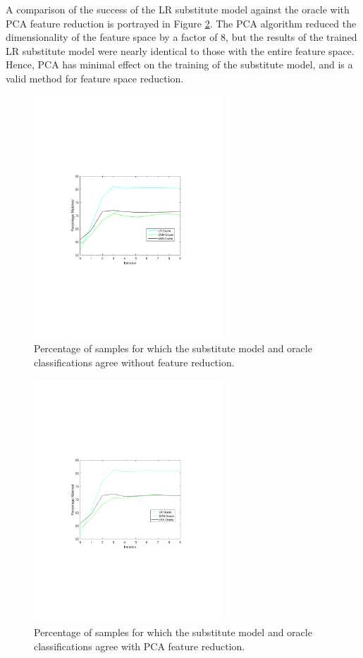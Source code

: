 A comparison of the success of the LR substitute model against the oracle with PCA feature reduction is portrayed in Figure \ref{fig:sub_approx_pca}. The PCA algorithm reduced the dimensionality of the feature space by a factor of 8, but the results of the trained LR substitute model were nearly identical to those with the entire feature space. Hence, PCA has minimal effect on the training of the substitute model, and is a valid method for feature space reduction. 

\begin{figure}
    \centering
    \includegraphics[width =200pt, trim = 110 240 130 250, clip]{figs/final_fig_1.pdf}
    \caption{Percentage of samples for which the substitute model and oracle classifications agree without feature reduction.}
    \label{fig:sub_approx}
\end{figure}

\begin{figure}
    \centering
    \includegraphics[width =200pt, trim = 110 240 130 250, clip]{figs/fig1_pca.pdf}
    \caption{Percentage of samples for which the substitute model and oracle classifications agree with PCA feature reduction.}
    \label{fig:sub_approx_pca}
\end{figure}

